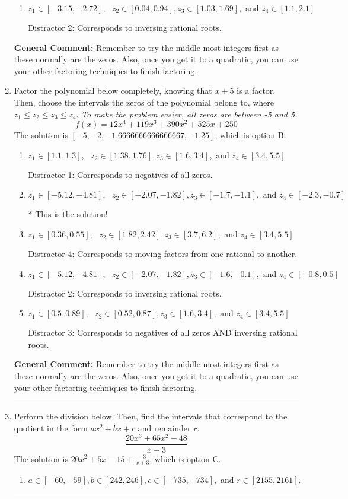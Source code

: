 \documentclass{extbook}[14pt]
\newcommand{\litem}[1]{\item #1

\rule{\textwidth}{0.4pt}}
\begin{document}
\begin{enumerate}
{\begin{enumerate}[label=\Alph*.]
* This is the solution!
\item \( z_1 \in [-3.15, -2.72], \text{   }  z_2 \in [0.04, 0.94], z_3 \in [1.03, 1.69], \text{   and   } z_4 \in [1.1, 2.1] \)

 Distractor 2: Corresponds to inversing rational roots.
\end{enumerate}

\textbf{General Comment:} Remember to try the middle-most integers first as these normally are the zeros. Also, once you get it to a quadratic, you can use your other factoring techniques to finish factoring.
}
\litem{
Factor the polynomial below completely, knowing that $x+5$ is a factor. Then, choose the intervals the zeros of the polynomial belong to, where $z_1 \leq z_2 \leq z_3 \leq z_4$. \textit{To make the problem easier, all zeros are between -5 and 5.}
\[ f(x) = 12x^{4} +119 x^{3} +390 x^{2} +525 x + 250 \]The solution is \( [-5, -2, -1.6666666666666667, -1.25] \), which is option B.\begin{enumerate}[label=\Alph*.]
\item \( z_1 \in [1.1, 1.3], \text{   }  z_2 \in [1.38, 1.76], z_3 \in [1.6, 3.4], \text{   and   } z_4 \in [3.4, 5.5] \)

 Distractor 1: Corresponds to negatives of all zeros.
\item \( z_1 \in [-5.12, -4.81], \text{   }  z_2 \in [-2.07, -1.82], z_3 \in [-1.7, -1.1], \text{   and   } z_4 \in [-2.3, -0.7] \)

* This is the solution!
\item \( z_1 \in [0.36, 0.55], \text{   }  z_2 \in [1.82, 2.42], z_3 \in [3.7, 6.2], \text{   and   } z_4 \in [3.4, 5.5] \)

 Distractor 4: Corresponds to moving factors from one rational to another.
\item \( z_1 \in [-5.12, -4.81], \text{   }  z_2 \in [-2.07, -1.82], z_3 \in [-1.6, -0.1], \text{   and   } z_4 \in [-0.8, 0.5] \)

 Distractor 2: Corresponds to inversing rational roots.
\item \( z_1 \in [0.5, 0.89], \text{   }  z_2 \in [0.52, 0.87], z_3 \in [1.6, 3.4], \text{   and   } z_4 \in [3.4, 5.5] \)

 Distractor 3: Corresponds to negatives of all zeros AND inversing rational roots.
\end{enumerate}

\textbf{General Comment:} Remember to try the middle-most integers first as these normally are the zeros. Also, once you get it to a quadratic, you can use your other factoring techniques to finish factoring.
}
\litem{
Perform the division below. Then, find the intervals that correspond to the quotient in the form $ax^2+bx+c$ and remainder $r$.
\[ \frac{20x^{3} +65 x^{2} -48}{x + 3} \]The solution is \( 20x^{2} +5 x -15 + \frac{-3}{x + 3} \), which is option C.\begin{enumerate}[label=\Alph*.]
\item \( a \in [-60, -59], b \in [242, 246], c \in [-735, -734], \text{ and } r \in [2155, 2161]. \)


\end{enumerate}}
\end{enumerate}
\end{document}
